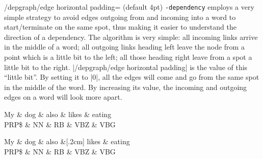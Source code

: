 \documentclass[a4paper]{ltxdoc}
\def\pkgname{\tikzname{}\texttt{-dependency}}
\begin{document}
\begin{key}{/depgraph/edge horizontal padding= (default 4pt)}
   \pkgname{} employs a very simple strategy to avoid edges outgoing from and incoming into a word to start/terminate on the same spot, thus making it easier to understand the direction of a dependency. The algorithm is very simple: all incoming links arrive in the middle of a word; all outgoing links heading left leave the node from a point which is a little bit to the left; all those heading right leave from a spot a little bit to the right. |/depgraph/edge horizontal padding| is the value of this ``little bit''. By setting it to |0|, all the edges will come and go from the same spot in the middle of the word. By increasing its value, the incoming and outgoing edges on a word will look more apart.
\begin{codeexample}[]
\begin{dependency}[edge horizontal padding=0] %
   \begin{deptext}[column sep=.7cm]
      My \& dog \& also \& likes \& eating \\
      PRP\$ \& NN \& RB \& VBZ \& VBG \\
   \end{deptext}
\end{dependency}
\quad
\begin{dependency}[edge horizontal padding=10pt] %
   \begin{deptext}[column sep=.7cm]
      My \& dog \& also \&[.2cm] likes \& eating \\
      PRP\$ \& NN \& RB \& VBZ \& VBG \\
   \end{deptext}
\end{dependency}
\end{codeexample}
\end{key}
\end{document}
